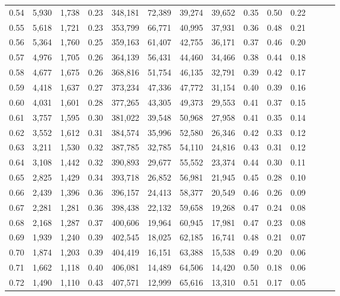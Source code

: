\begin{tabular}{rrrrrrrrrrrrrr}
0.54 &  5,930 &  1,738 &  0.23 &  348,181 &   72,389 &  39,274 &  39,652 &  0.35 &  0.50 &      0.22 \\
0.55 &  5,618 &  1,721 &  0.23 &  353,799 &   66,771 &  40,995 &  37,931 &  0.36 &  0.48 &      0.21 \\
0.56 &  5,364 &  1,760 &  0.25 &  359,163 &   61,407 &  42,755 &  36,171 &  0.37 &  0.46 &      0.20 \\
0.57 &  4,976 &  1,705 &  0.26 &  364,139 &   56,431 &  44,460 &  34,466 &  0.38 &  0.44 &      0.18 \\
0.58 &  4,677 &  1,675 &  0.26 &  368,816 &   51,754 &  46,135 &  32,791 &  0.39 &  0.42 &      0.17 \\
0.59 &  4,418 &  1,637 &  0.27 &  373,234 &   47,336 &  47,772 &  31,154 &  0.40 &  0.39 &      0.16 \\
0.60 &  4,031 &  1,601 &  0.28 &  377,265 &   43,305 &  49,373 &  29,553 &  0.41 &  0.37 &      0.15 \\
0.61 &  3,757 &  1,595 &  0.30 &  381,022 &   39,548 &  50,968 &  27,958 &  0.41 &  0.35 &      0.14 \\
0.62 &  3,552 &  1,612 &  0.31 &  384,574 &   35,996 &  52,580 &  26,346 &  0.42 &  0.33 &      0.12 \\
0.63 &  3,211 &  1,530 &  0.32 &  387,785 &   32,785 &  54,110 &  24,816 &  0.43 &  0.31 &      0.12 \\
0.64 &  3,108 &  1,442 &  0.32 &  390,893 &   29,677 &  55,552 &  23,374 &  0.44 &  0.30 &      0.11 \\
0.65 &  2,825 &  1,429 &  0.34 &  393,718 &   26,852 &  56,981 &  21,945 &  0.45 &  0.28 &      0.10 \\
0.66 &  2,439 &  1,396 &  0.36 &  396,157 &   24,413 &  58,377 &  20,549 &  0.46 &  0.26 &      0.09 \\
0.67 &  2,281 &  1,281 &  0.36 &  398,438 &   22,132 &  59,658 &  19,268 &  0.47 &  0.24 &      0.08 \\
0.68 &  2,168 &  1,287 &  0.37 &  400,606 &   19,964 &  60,945 &  17,981 &  0.47 &  0.23 &      0.08 \\
0.69 &  1,939 &  1,240 &  0.39 &  402,545 &   18,025 &  62,185 &  16,741 &  0.48 &  0.21 &      0.07 \\
0.70 &  1,874 &  1,203 &  0.39 &  404,419 &   16,151 &  63,388 &  15,538 &  0.49 &  0.20 &      0.06 \\
0.71 &  1,662 &  1,118 &  0.40 &  406,081 &   14,489 &  64,506 &  14,420 &  0.50 &  0.18 &      0.06 \\
0.72 &  1,490 &  1,110 &  0.43 &  407,571 &   12,999 &  65,616 &  13,310 &  0.51 &  0.17 &      0.05 \\

\end{tabular}
